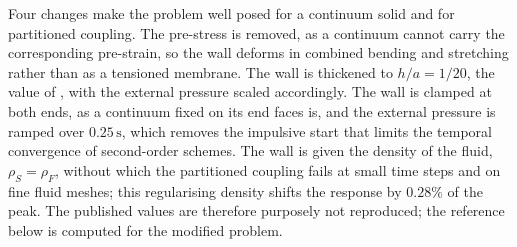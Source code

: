 Four changes make the problem well posed for a continuum solid and for partitioned coupling.
The pre-stress is removed, as a continuum cannot carry the corresponding pre-strain, so the wall deforms in combined bending and stretching rather than as a tensioned membrane.
The wall is thickened to $h/a = 1/20$, the value of \citet{Heil2008}, with the external pressure scaled accordingly.
The wall is clamped at both ends, as a continuum fixed on its end faces is, and the external pressure is ramped over $0.25\,\mathrm{s}$, which removes the impulsive start that limits the temporal convergence of second-order schemes.
The wall is given the density of the fluid, $\rho_S = \rho_F$, without which the partitioned coupling fails at small time steps and on fine fluid meshes; this regularising density shifts the response by $0.28\%$ of the peak.
The published values are therefore purposely not reproduced; the reference below is computed for the modified problem.


